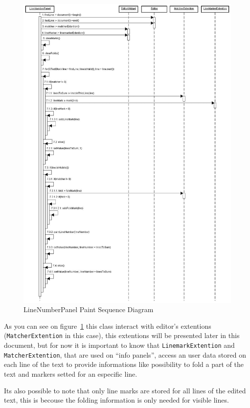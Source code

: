 \documentclass[11pt,a4paper]{report}
\begin{document}
\begin{figure}
\centering
\includegraphics{images/linenumberpaint.jpg}
\caption{LineNumberPanel Paint Sequence Diagram} \label{linenumberpaint}
\end{figure}

As you can see on figure~\ref{linenumberpaint} this class interact with editor's extentions (\texttt{MatcherExtention} in this case), this extentions will be presented later in this document, but for now it is important to know that \texttt{LinemarkExtention} and \texttt{MatcherExtention}, that are used on ``info panels'', access an user data stored on each line of the text to provide informations like possibility to fold a part of the text and markers setted for an especific line.

Its also possible to note that only line marks are stored for all lines of the edited text, this is becouse the folding information is only needed for visible lines.
\end{document}

